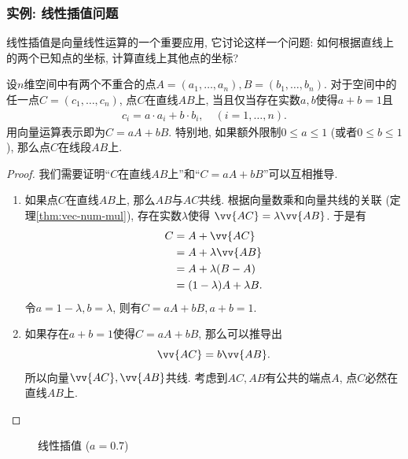 \subsubsection{实例: 线性插值问题}

线性插值是向量线性运算的一个重要应用, 它讨论这样一个问题:
如何根据直线上的两个已知点的坐标, 计算直线上其他点的坐标?

\begin{theorem}[线性插值]
  设$n$维空间中有两个不重合的点$A=(a_1,\dots,a_n),B=(b_1,\dots,b_n)$.
  对于空间中的任一点$C=(c_1,\dots,c_n)$,
  点$C$在直线$AB$上, 当且仅当存在实数$a,b$使得$a+b=1$且
  \begin{align*}
    c_i = a \cdot a_i + b \cdot b_i,
    \quad (i=1,\dots,n).
  \end{align*}
  用向量运算表示即为$C = aA + bB$.
  特别地, 如果额外限制$0 \le a \le 1$
  (或者$0 \le b \le 1$),
  那么点$C$在线段$AB$上.
\end{theorem}

\begin{proof}
  我们需要证明``$C$在直线$AB$上''和``$C=aA+bB$''可以互相推导.
  \begin{enumerate}[label=(\alph*)]
    \item 如果点$C$在直线$AB$上, 那么$AB$与$AC$共线.
          根据向量数乘和向量共线的关联 (定理\ref{thm:vec-num-mul}),
          存在实数$\lambda$使得
          $\vv{AC}=\lambda\vv{AB}$. 于是有
          \begin{align*}
            C & = A + \vv{AC}                \\
              & = A + \lambda \vv{AB}        \\
              & = A + \lambda (B - A)        \\
              & = (1-\lambda) A + \lambda B.
          \end{align*}
          令$a=1-\lambda, b=\lambda$,
          则有$C=aA+bB, a+b=1$.
    \item 如果存在$a+b=1$使得$C=aA+bB$, 那么可以推导出
          \[\vv{AC} = b\vv{AB}.\]
          所以向量$\vv{AC},\vv{AB}$共线.
          考虑到$AC,AB$有公共的端点$A$,
          点$C$必然在直线$AB$上.
  \end{enumerate}
\end{proof}

\begin{figure}[htbp]
  \centering
  \caption{线性插值 ($a=0.7$)}
  \label{fig:linear-interp}
\end{figure}

